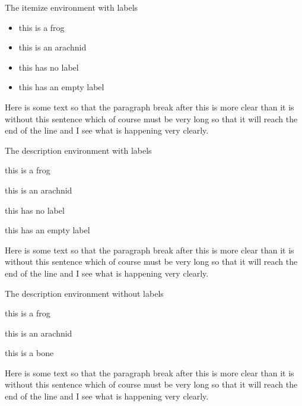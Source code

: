 ﻿\documentclass{article}
\begin{document}
The itemize environment with labels
\begin{itemize}
\item[frog~~~] this is a frog
\item[spider~~~] this is an arachnid
\item this has no label
\item[] this has an empty label
\end{itemize}
Here is some text so that the paragraph break after this
is more clear than it is without this sentence which of
course must be very long so that it will reach the end of
the line and I see what is happening very clearly.

The description environment with labels
\begin{description}
\item[frog~~~] this is a frog
\item[spider~~~] this is an arachnid
\item this has no label
\item[] this has an empty label
\end{description}
Here is some text so that the paragraph break after this
is more clear than it is without this sentence which of
course must be very long so that it will reach the end of
the line and I see what is happening very clearly.

The description environment without labels
\begin{description}
\item[] this is a frog
\item[] this is an arachnid
\item this is a bone
\end{description}
Here is some text so that the paragraph break after this
is more clear than it is without this sentence which of
course must be very long so that it will reach the end of
the line and I see what is happening very clearly.
\end{document}
